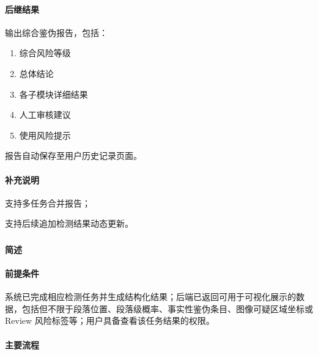 \paragraph*{后继结果}

输出综合鉴伪报告，包括：

\begin{enumerate}
    \item 综合风险等级
    \item 总体结论
    \item 各子模块详细结果
    \item 人工审核建议
    \item 使用风险提示
\end{enumerate}

报告自动保存至用户历史记录页面。

\paragraph*{补充说明}

支持多任务合并报告；

支持后续追加检测结果动态更新。



\subsubsection{}

\paragraph*{简述}


\paragraph*{前提条件}

系统已完成相应检测任务并生成结构化结果；后端已返回可用于可视化展示的数据，包括但不限于段落位置、段落级概率、事实性鉴伪条目、图像可疑区域坐标或 Review 风险标签等；用户具备查看该任务结果的权限。

\paragraph*{主要流程}

